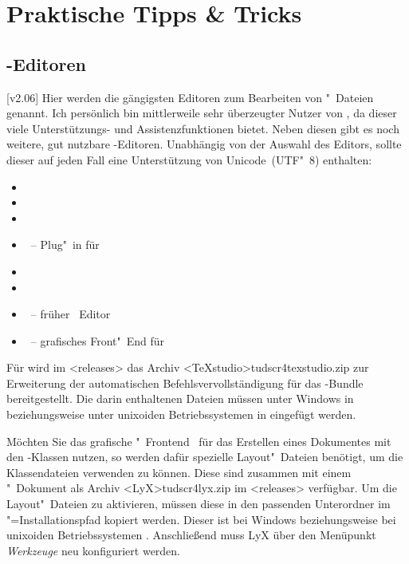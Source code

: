 \chapter{Praktische Tipps \& Tricks}
\newcommand*\TaT{\hyperref[sec:tips]{Tipps \& Tricks}:\xspace}
\section{-Editoren}
%
[v2.06]
%
Hier werden die gängigsten Editoren zum Bearbeiten von "~Dateien 
genannt. Ich persönlich bin mittlerweile sehr überzeugter Nutzer von 
, da dieser viele Unterstützungs- und 
Assistenzfunktionen bietet. Neben diesen gibt es noch weitere, gut nutzbare 
-Editoren. Unabhängig von der Auswahl des Editors, sollte dieser 
auf jeden Fall eine Unterstützung von Unicode~(UTF"~8) enthalten:
%
\begin{itemize}
\item {}
\item {}
\item {}
\item {}~-- Plug"~in für 
\item {}
\item {}
\item {}~-- früher ~Editor
\item {}~-- grafisches Front"~End für 
\end{itemize}
%
Für  wird im \GitHubRepo*<releases> das Archiv 
\GitHubDownload<TeXstudio>{tudscr4texstudio.zip} zur Erweiterung der 
automatischen Befehlsvervollständigung für das \TUDScript-Bundle 
bereitgestellt. Die darin enthaltenen Dateien müssen unter Windows in 
 beziehungsweise unter unixoiden 
Betriebssystemen in  eingefügt werden.

Möchten Sie das grafische "~Frontend~ 
für das Erstellen eines Dokumentes mit den \TUDScript-Klassen nutzen, so werden 
dafür spezielle Layout"~Dateien benötigt, um die Klassendateien verwenden zu 
können. Diese sind zusammen mit einem "~Dokument als 
Archiv \GitHubDownload<LyX>{tudscr4lyx.zip} im \GitHubRepo*<releases> 
verfügbar. Um die Layout"~Dateien zu aktivieren, müssen diese in den passenden 
Unterordner im "=Installationspfad kopiert werden. 
Dieser ist bei Windows
beziehungsweise bei unixoiden Betriebssystemen .
Anschließend muss LyX über den Menüpunkt \emph{Werkzeuge} neu konfiguriert 
werden. 



